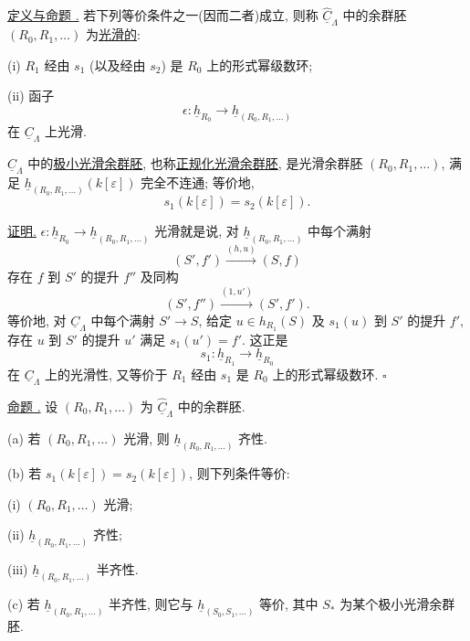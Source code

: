 
\underline{定义与命题 .}
若下列等价条件之一(因而二者)成立, 则称
$\widehat{\underline C}_\Lambda$ 中的余群胚 $(R_0,R_1,\ldots)$ 为\underline{光滑的}:

(i) $R_1$ 经由 $s_1$ (以及经由 $s_2$) 是 $R_0$ 上的形式幂级数环;

(ii) 函子
\[
 \epsilon:\underline h_{R_0}
 \longrightarrow\underline h_{(R_0,R_1,\ldots)}
\]
在 $\underline C_\Lambda$ 上光滑.

$\widehat{\underline C}_\Lambda$ 中的\underline{极小光滑余群胚},
也称\underline{正规化光滑余群胚}, 是光滑余群胚 $(R_0,R_1,\ldots)$,
满足 $\underline h_{(R_0,R_1,\ldots)}(k[\varepsilon])$ 完全不连通;
等价地,
\[
 s_1(k[\varepsilon])=s_2(k[\varepsilon]).
\]

\underline{证明.}
$\epsilon:\underline h_{R_0}\to\underline h_{(R_0,R_1,\ldots)}$
光滑就是说, 对 $\underline h_{(R_0,R_1,\ldots)}$ 中每个满射
\[
 (S',f')\xrightarrow{(h,u)}(S,f)
\]
存在 $f$ 到 $S'$ 的提升 $f''$ 及同构
\[
 (S',f'')\xrightarrow{(1,u')}(S',f').
\]
等价地, 对 $\underline C_\Lambda$ 中每个满射 $S'\to S$,
给定 $u\in h_{R_1}(S)$ 及 $s_1(u)$ 到 $S'$ 的提升 $f'$,
存在 $u$ 到 $S'$ 的提升 $u'$ 满足 $s_1(u')=f'$.
这正是
\[
 s_1:\underline h_{R_1}\longrightarrow\underline h_{R_0}
\]
在 $\underline C_\Lambda$ 上的光滑性, 又等价于
$R_1$ 经由 $s_1$ 是 $R_0$ 上的形式幂级数环. \hfill$\square$

\underline{命题 .}
设 $(R_0,R_1,\ldots)$ 为 $\widehat{\underline C}_\Lambda$ 中的余群胚.

(a) 若 $(R_0,R_1,\ldots)$ 光滑, 则 $\underline h_{(R_0,R_1,\ldots)}$ 齐性.

(b) 若 $s_1(k[\varepsilon])=s_2(k[\varepsilon])$, 则下列条件等价:

(i) $(R_0,R_1,\ldots)$ 光滑;

(ii) $\underline h_{(R_0,R_1,\ldots)}$ 齐性;

(iii) $\underline h_{(R_0,R_1,\ldots)}$ 半齐性.


(c) 若 $\underline h_{(R_0,R_1,\ldots)}$ 半齐性,
则它与 $\underline h_{(S_0,S_1,\ldots)}$ 等价,
其中 $S_*$ 为某个极小光滑余群胚.


